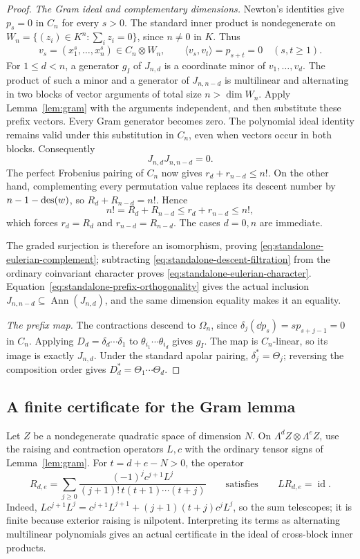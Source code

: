 \begin{proof}
\emph{The Gram ideal and complementary dimensions.}
Newton's identities give $p_s=0$ in $C_n$ for every $s>0$.
The standard inner product is nondegenerate on
$W_n=\{(z_i)\in K^n:\sum_i z_i=0\}$, since $n\ne0$ in $K$.
Thus
\[
 v_s=(x_1^s,\ldots,x_n^s)\in C_n\otimes W_n,
 \qquad \langle v_s,v_t\rangle=p_{s+t}=0
 \quad(s,t\ge1).
\]
For $1\le d<n$, a generator $g_I$ of $J_{n,d}$ is a coordinate minor of
$v_1,\ldots,v_d$.  The product of such a minor and a generator
of $J_{n,n-d}$ is multilinear and alternating in two blocks of
vector arguments of total size $n>\dim W_n$.  Apply
Lemma~\ref{lem:gram} with the arguments independent, and then
substitute these prefix vectors.  Every Gram generator becomes
zero.  The polynomial ideal identity remains valid under this
substitution in $C_n$, even when vectors occur in both blocks.
Consequently
\begin{equation}\label{eq:standalone-prefix-orthogonality}
                 J_{n,d}J_{n,n-d}=0.
\end{equation}
The perfect Frobenius pairing of $C_n$ now gives
$r_d+r_{n-d}\le n!$.  On the other hand, complementing every
permutation value replaces its descent number by $n-1-\operatorname{des}(w)$,
so $R_d+R_{n-d}=n!$.  Hence
\[
 n!=R_d+R_{n-d}\le r_d+r_{n-d}\le n!,
\]
which forces $r_d=R_d$ and $r_{n-d}=R_{n-d}$.
The cases $d=0,n$ are immediate.

The graded surjection is therefore an isomorphism, proving
\eqref{eq:standalone-eulerian-complement}; subtracting
\eqref{eq:standalone-descent-filtration} from the ordinary
coinvariant character proves
\eqref{eq:standalone-eulerian-character}.
Equation~\eqref{eq:standalone-prefix-orthogonality} gives the
actual inclusion $J_{n,n-d}\subseteq\operatorname{Ann}(J_{n,d})$,
and the same dimension equality makes it an equality.

\emph{The prefix map.}
The contractions descend to $\Omega_n$, since
$\delta_j(\dd p_s)=s p_{s+j-1}=0$ in $C_n$.
Applying $D_d=\delta_d\cdots\delta_1$ to
$\theta_{i_1}\cdots\theta_{i_d}$ gives $g_I$.
The map is $C_n$-linear, so its image is exactly $J_{n,d}$.
Under the standard apolar pairing, $\delta_j^*=\Theta_j$;
reversing the composition order gives
$D_d^*=\Theta_1\cdots\Theta_d$.
\end{proof}

\subsection{A finite certificate for the Gram lemma}

Let $Z$ be a nondegenerate quadratic space of dimension $N$. On
$\Lambda^dZ\otimes\Lambda^eZ$, use the raising and contraction
operators $L,c$ with the ordinary tensor signs of Lemma~\ref{lem:gram}.
For $t=d+e-N>0$, the operator
\begin{equation}\label{eq:gram-finite-certificate}
 R_{d,e}=\sum_{j\ge0}
 \frac{(-1)^j c^{j+1}L^j}
      {(j+1)!\,t(t+1)\cdots(t+j)}
 \qquad\text{satisfies}\qquad LR_{d,e}=\operatorname{id}.
\end{equation}
Indeed,
$Lc^{j+1}L^j=c^{j+1}L^{j+1}+(j+1)(t+j)c^jL^j$,
so the sum telescopes; it is finite because exterior raising is
nilpotent. Interpreting its terms as alternating multilinear
polynomials gives an actual certificate in the ideal of
cross-block inner products.
